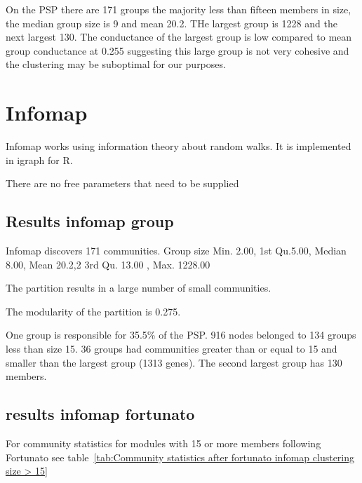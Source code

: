 On the PSP there are 171 groups the majority less than fifteen members in size, the median group size is 9 and mean 20.2. THe largest group is 1228 and the next largest 130. The conductance of the largest group is low compared to mean group conductance at 0.255 suggesting this large group is not very cohesive and the clustering may be suboptimal for our purposes. 
\section{Infomap}
\label{sec:infomap in methods}

Infomap works using information theory about random walks. It is implemented in igraph for R. 

There are no free parameters that need to be supplied

\subsection{Results infomap group}

Infomap discovers 171 communities. Group size  Min. 2.00, 1st  Qu.5.00,   Median 8.00,     Mean 20.2,2 3rd Qu. 13.00 ,  Max. 1228.00

The partition results in a large number of small communities. 

The modularity of the partition is 0.275.

One group is responsible for 35.5\% of the PSP. 916 nodes belonged to 134 groups less than size 15. 36 groups had communities greater than or equal to 15 and smaller than the largest group (1313 genes). The second largest group has 130 members.  
\subsection{results infomap fortunato}
For community statistics for modules with 15 or more members following Fortunato \cite{fortunato2016community} see table~\ref{tab:Community statistics after fortunato infomap clustering size > 15}

